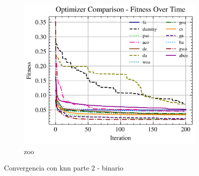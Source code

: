 \begin{figure}[htp]
\begin{subfigure}[htp]{0.45\textwidth}
        \includegraphics[width=\textwidth]{imagenes/fitness_charts/img/binary/zoo/optimizers_fitness_knn.png}
        \caption{zoo}
    \end{subfigure}
    \caption{Convergencia con knn parte 2 - binario}
    \label{fig:convergencia_knn_2_bin}
\end{figure}

